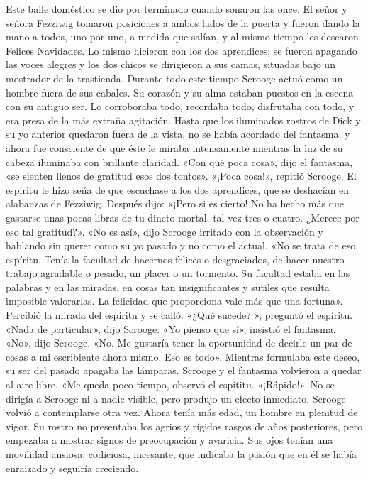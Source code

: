 \documentclass{novela}
\begin{document}
 Este baile doméstico se dio por terminado cuando sonaron las once. El señor y señora Fezziwig tomaron posiciones a ambos lados de la puerta y fueron dando la mano a todos, uno por uno, a medida que salían, y al mismo tiempo les desearon Felices Navidades. Lo mismo hicieron con los dos aprendices; se fueron apagando las voces alegres y los dos chicos se dirigieron a sus camas, situadas bajo un mostrador de la trastienda.
 Durante todo este tiempo Scrooge actuó como un hombre fuera de sus cabales. Su corazón y su alma estaban puestos en la escena con su antiguo ser. Lo corroboraba todo, recordaba todo, disfrutaba con todo, y era presa de la más extraña agitación. Hasta que los iluminados rostros de Dick y su yo anterior quedaron fuera de la vista, no se había acordado del fantasma, y ahora fue consciente de que éste le miraba intensamente mientras la luz de su cabeza iluminaba con brillante claridad.
 «Con qué poca cosa», dijo el fantasma, «se sienten llenos de gratitud esos dos tontos».
 «¡Poca cosa!», repitió Scrooge.
 El espiritu le hizo seña de que escuchase a los dos aprendices, que se deshacían en alabanzas de Fezziwig. Después dijo:
 «¡Pero si es cierto! No ha hecho más que gastarse unas pocas libras de tu dineto mortal, tal vez tres o cuatro. ¿Merece por eso tal gratitud?».
 «No es así», dijo Scrooge irritado con la observación y hablando sin querer como su yo pasado y no como el actual.
 «No se trata de eso, espíritu. Tenía la facultad de hacernos felices o desgraciados, de hacer nuestro trabajo agradable o pesado, un placer o un tormento. Su facultad estaba en las palabras y en las miradas, en cosas tan insignificantes y sutiles que resulta imposible valorarlas. La felicidad que proporciona vale más que una fortuna».
 Percibió la mirada del espíritu y se calló.
 «¿Qué sucede? », preguntó el espíritu.
 «Nada de particular», dijo Scrooge.
 «Yo pienso que sí», insistió el fantasma.
 «No», dijo Scrooge, «No. Me gustaría tener la oportunidad de decirle un par de cosas a mi escribiente ahora mismo. Eso es todo».
 Mientras formulaba este deseo, su ser del pasado apagaba las lámparas. Scrooge y el fantasma volvieron a quedar al aire libre.
 «Me queda poco tiempo, observó el espítitu. «¡Rápido!».
 No se dirigía a Scrooge ni a nadie visible, pero produjo un efecto inmediato. Scrooge volvió a contemplarse otra vez. Ahora tenía más edad, un hombre en plenitud de vigor. Su rostro no presentaba los agrios y rígidos rasgos de años posteriores, pero empezaba a mostrar signos de preocupación y avaricia. Sus ojos tenían una movilidad ansiosa, codiciosa, incesante, que indicaba la pasión que en él se había enraizado y seguiría creciendo.
\end{document}

